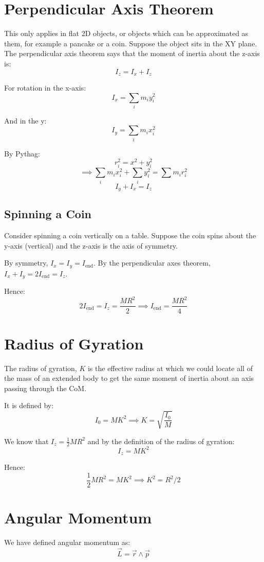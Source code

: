 
\section{Perpendicular Axis Theorem}
This only applies in flat 2D objects, or objects which can be approximated as them, for example a pancake or a coin. Suppose the object sits in the XY plane. The perpendicular axis theorem says that the moment of inertia about the z-axis is:
\[
    I_z = I_x + I_z
\]

For rotation in the x-axis:
\[
    I_x = \sum_i m_i y^2_i
\]

And in the y:
\[
    I_y = \sum_i m_i x^2_i
\]

By Pythag:
\[
    r_i^2 = x^2 + y^2_i
\]
\[
    \implies \sum_i m_i x_i^2 + \sum_i y_i^2 = \sum m_i r_i^2
\]
\[
    I_y + I_x = I_z
\]

\subsection{Spinning a Coin}
Consider spinning a coin vertically on a table. Suppose the coin spins about the y-axis (vertical) and the z-axis is the axis of symmetry. 

By symmetry, $I_x = I_y = I_\text{end}$. By the perpendicular axes theorem, $I_x + I_y = 2 I_\text{end} = I_z$.

Hence:
\[
    2 I_\text{end} = I_z = \frac{MR^2}{2} \implies I_\text{end} = \frac{MR^2}{4} 
\]

\section{Radius of Gyration}
The radius of gyration, $K$ is the effective radius at which we could locate all of the mass of an extended body to get the same moment of inertia about an axis passing through the CoM.

It is defined by:
\[
    I_0 = M K^2 \implies K = \sqrt{\frac{I_0}{M}}
\]

We know that $I_z = \frac{1}{2}MR^2$ and by the definition of the radius of gyration:
\[
    I_z = MK^2
\]

Hence:
\[
    \frac{1}{2}MR^2 = MK^2 \implies K^2 = R^2 / 2
\]

\section{Angular Momentum}
We have defined angular momentum as:
\[
    \vec{L} =\vec{r} \wedge \vec{p}
\]

